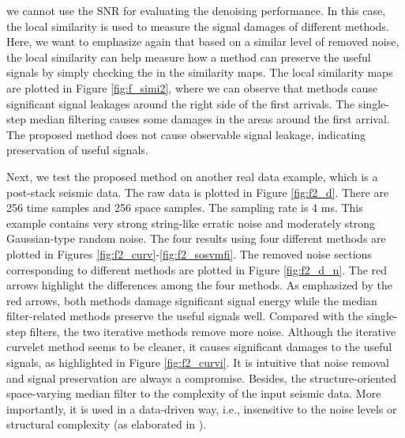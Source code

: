 we cannot use the SNR for evaluating the denoising performance. In this case, the local similarity is used to measure the signal damages of  different methods. Here, we want to emphasize again that based on a similar level of removed noise, the local similarity can help measure how a method can preserve the useful signals by simply checking the  in the similarity maps. The local similarity maps are plotted in Figure \ref{fig:f_simi2}, where we can observe that  methods cause significant signal leakages around the right side of the first arrivals. The single-step median filtering causes some damages in the areas around the first arrival. The proposed method does not cause observable signal leakage, indicating  preservation of  useful signals. 

Next, we test the proposed method on another real data example, which is a post-stack seismic data. The raw data is plotted in Figure \ref{fig:f2_d}. There are 256 time samples and 256 space samples. The sampling rate is 4 ms. This example contains very strong string-like erratic noise and moderately strong Gaussian-type random noise.  The four results using four different methods are plotted in Figures \ref{fig:f2_curv}-\ref{fig:f2_sosvmfi}. The removed noise sections corresponding to different methods are plotted in Figure \ref{fig:f2_d_n}. The red arrows highlight the differences among the four methods. As emphasized by the red arrows, both  methods damage significant signal energy while the median filter-related methods preserve the useful signals well. Compared with the single-step filters, the two iterative methods remove more noise. Although the iterative curvelet method seems to be cleaner, it causes significant damages to the useful signals, as highlighted in Figure \ref{fig:f2_curvi}.  It is intuitive that noise removal and signal preservation are always a compromise.  Besides, the structure-oriented space-varying median filter \cite[]{sosvmf}  to the complexity of the input seismic data. More importantly, it is used in a data-driven way, i.e., insensitive to the noise levels or structural complexity (as elaborated in \cite{sosvmf}).


